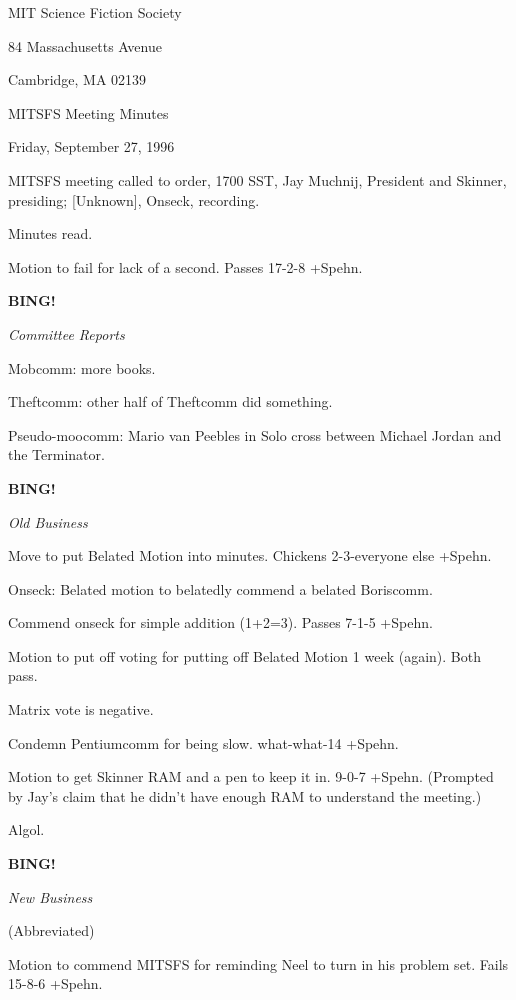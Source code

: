 \documentclass[12pt]{article}
\newcommand{\bing}{{\bf BING!} }
\newcommand{\goto}[1]{\bing \vskip 12pt \centerline{{\em{#1}}}}
\begin{document}
\begin{center}

MIT Science Fiction Society 

84 Massachusetts Avenue

Cambridge, MA 02139

\vspace{12pt}

MITSFS Meeting Minutes 

Friday, September 27, 1996

\end{center}
 
\vspace{18pt}

\setlength{\parskip}{6pt}

\noindent
MITSFS meeting called to order, 1700 SST,
Jay Muchnij, President and Skinner, presiding; [Unknown], Onseck, recording.

Minutes read.

Motion to fail for lack of a second. Passes 17-2-8 +Spehn.

\goto{Committee Reports}

Mobcomm: more books.

Theftcomm: other half of Theftcomm did something.

Pseudo-moocomm: Mario van Peebles in Solo cross between Michael Jordan and the Terminator.

\goto{Old Business}

Move to put Belated Motion into minutes. Chickens 2-3-everyone else +Spehn.

Onseck: Belated motion to belatedly commend a belated Boriscomm.

Commend onseck for simple addition (1+2=3). Passes 7-1-5 +Spehn.

Motion to put off voting for putting off Belated Motion 1 week (again). Both pass.

Matrix vote is negative.

Condemn Pentiumcomm for being slow. what-what-14 +Spehn.

Motion to get Skinner RAM and a pen to keep it in. 9-0-7 +Spehn. (Prompted by Jay's claim that he didn't have enough RAM to understand the meeting.)

Algol.

\goto{New Business}

(Abbreviated)

Motion to commend MITSFS for reminding Neel to turn in his problem set. Fails 15-8-6 +Spehn.
\end{document}
